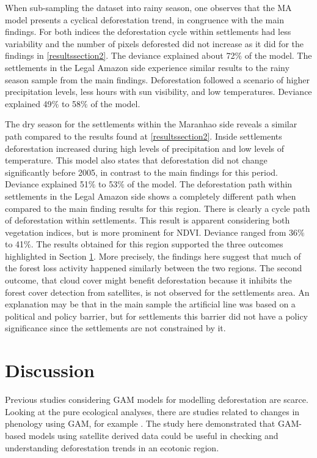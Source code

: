When sub-sampling the dataset into rainy season, one observes that the MA model presents a cyclical deforestation trend, in congruence with the main findings. For both indices the deforestation cycle within settlements had less variability and the number of pixels deforested did not increase as it did for the findings in \ref{resultssection2}. The deviance explained about 72$\%$ of the model. The settlements in the Legal Amazon side experience similar results to the rainy season sample from the main findings. Deforestation followed a scenario of higher precipitation levels, less hours with sun visibility, and low temperatures. Deviance explained 49$\%$ to 58$\%$ of the model. 

The dry season for the settlements within the Maranhao side reveals a similar path compared to the results found at \ref{resultssection2}. Inside settlements deforestation increased during high levels of precipitation and low levels of temperature. This model also states that deforestation did not change significantly before 2005, in contrast to the main findings for this period. Deviance explained 51$\%$ to 53$\%$ of the model. The deforestation path within settlements in the Legal Amazon side shows a completely different path when compared to the main finding results for this region. There is clearly a cycle path of deforestation within settlements. This result is apparent considering both vegetation indices, but is more prominent for NDVI. Deviance ranged from 36$\%$ to 41$\%$. The results obtained for this region supported the three outcomes highlighted in Section \ref{ref:discussion}. More precisely, the findings here suggest that much of the forest loss activity happened similarly between the two regions. The second outcome, that cloud cover might benefit deforestation because it inhibits the forest cover detection from satellites, is not observed for the settlements area. An explanation may be that in the main sample the artificial line was based on a political and policy barrier, but for settlements this barrier did not have a policy significance since the settlements are not constrained by it. 


\section{Discussion} \label{ref:discussion}

Previous studies considering GAM models for modelling deforestation are scarce. Looking at the pure ecological analyses, there are studies related to changes in phenology using GAM, for example \citet{TAPIA_2017}. The study here demonstrated that GAM-based models using satellite derived data could be useful in checking and understanding deforestation trends in an ecotonic region. 

